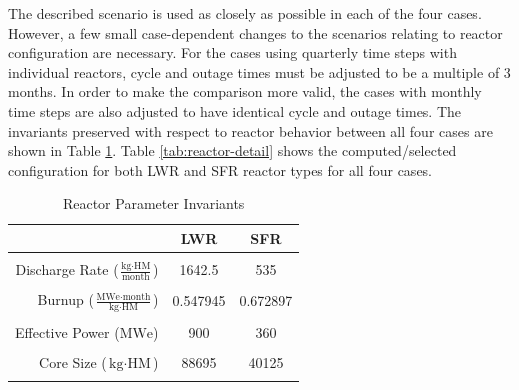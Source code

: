 \documentclass{style}
\begin{document}
The described scenario is used as closely as possible in each of the four
cases.  However, a few small case-dependent changes to the scenarios relating to
reactor configuration are necessary.  For the cases using quarterly time steps
with individual reactors, cycle and outage times must be adjusted to be a
multiple of 3 months.  In order to make the comparison more valid, the cases
with monthly time steps are also adjusted to have identical cycle and outage
times.  The invariants preserved with respect to reactor behavior between all
four cases are shown in Table \ref{tab:invar}.  Table \ref{tab:reactor-detail} shows
the computed/selected configuration for both LWR and SFR reactor types for all
four cases.

\begin{table}
    \captionsetup{justification=centering}
    \caption{Reactor Parameter Invariants}
    \centering
    \begin{tabular}{ |r | c c | }
        \hline                       
                                                                             & LWR      & SFR      \\
        \hline                       
                                                                             &          &          \\
        Discharge Rate ($\frac{\text{kg} \cdot \text{HM}}{\text{month}}$)           & 1642.5   & 535      \\
                                                                             &          &          \\
        Burnup  ($\frac{\text{MWe} \cdot \text{month}}{\text{kg} \cdot \text{HM}}$) & 0.547945 & 0.672897 \\
                                                                             &          &          \\
        Effective Power  ($\text{MWe}$)                                      & 900      & 360      \\
                                                                             &          &          \\
        Core Size  ($\text{kg} \cdot \text{HM}$)                                    & 88695    & 40125    \\
                                                                             &          &          \\
        \hline                       
    \end{tabular}
    \label{tab:invar}
\end{table}
\end{document}
